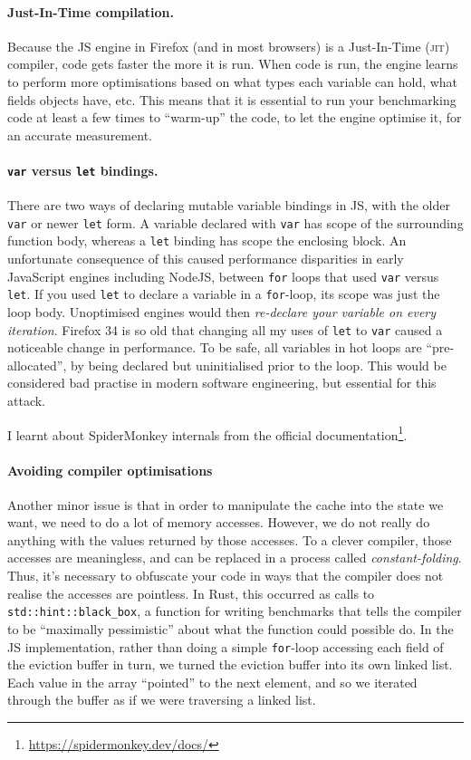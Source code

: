 \documentclass[a4paper,10pt,twocolumn]{article}
\theoremstyle{definition}
\newcommand*{\code}{\texttt}
\newcommand*{\acronym}{\textsc}
\begin{document}
\paragraph{Just-In-Time compilation.}
Because the JS engine in Firefox (and in most browsers) is a
Just-In-Time (\acronym{jit}) compiler, code gets faster the more it is run.
When code is run, the engine learns to perform more optimisations based on
what types each variable can hold, what fields objects have, etc.
This means that it is essential to run your benchmarking code at least a few
times to ``warm-up'' the code, to let the engine optimise it, for an
accurate measurement.

\paragraph{\code{var} versus \code{let} bindings.}
There are two ways of declaring mutable variable bindings in JS, with the
older \code{var} or newer \code{let} form.
A variable declared with \code{var} has scope of the surrounding function body,
whereas a \code{let} binding has scope the enclosing block.
An unfortunate consequence of this caused performance disparities in early
JavaScript engines including NodeJS, between \code{for} loops that used
\code{var} versus \code{let}.
If you used \code{let} to declare a variable in a \code{for}-loop, its scope was
just the loop body.
Unoptimised engines would then \emph{re-declare your variable on every
  iteration}.
Firefox 34 is so old that changing all my uses of \code{let} to \code{var}
caused a noticeable change in performance.
To be safe, all variables in hot loops are ``pre-allocated'', by being declared
but uninitialised prior to the loop.
This would be considered bad practise in modern software engineering, but
essential for this attack.

I learnt about SpiderMonkey internals from the official
documentation\footnote{\url{https://spidermonkey.dev/docs/}}.

\paragraph{Avoiding compiler optimisations}
Another minor issue is that in order to manipulate the cache into the state we
want, we need to do a lot of memory accesses.
However, we do not really do anything with the values returned by those
accesses.
To a clever compiler, those accesses are meaningless, and can be replaced in a
process called \emph{constant-folding}.
Thus, it's necessary to obfuscate your code in ways that the compiler does not
realise the accesses are pointless.
In Rust, this occurred as calls to \code{std::hint::black\_box}, a function for
writing benchmarks that tells the compiler to be ``maximally pessimistic'' about
what the function could possible do.
In the JS implementation, rather than doing a simple \code{for}-loop accessing
each field of the eviction buffer in turn, we turned the eviction buffer into
its own linked list.
Each value in the array ``pointed'' to the next element, and so we iterated
through the buffer as if we were traversing a linked list.
\end{document}
